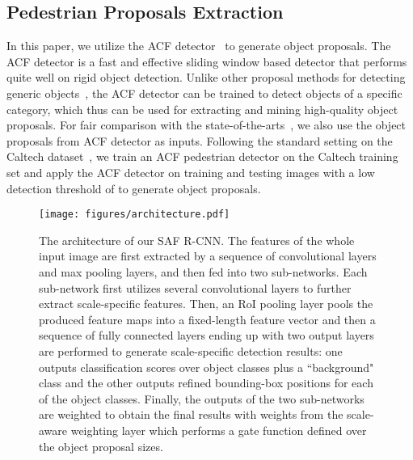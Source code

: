 \documentclass[journal]{IEEEtran}
\begin{document}
\subsection{Pedestrian Proposals Extraction}
In this paper, we utilize the ACF detector~\cite{dollar2014fast} to generate object proposals. The ACF detector is a fast and effective sliding window based detector that performs quite well on rigid object detection. Unlike other proposal methods for detecting generic objects~\cite{uijlings2013selective,arbelaez2014multiscale,zitnick2014edge}, the ACF detector can be trained to detect objects of a specific category, which thus can be used for extracting and mining high-quality object proposals. For fair comparison with the state-of-the-arts~\cite{hosang2015taking,ta_cnn}, we also use the object proposals from ACF detector as inputs. Following the standard setting on the Caltech dataset~\cite{dollar2012pedestrian}, we train an ACF pedestrian detector on the Caltech training set and apply the ACF detector on training and testing images with a low detection threshold of  to generate object proposals.

\begin{figure*}
	\begin{center}
		\texttt{[image: figures/architecture.pdf]}
		\caption{{The architecture of our SAF R-CNN. The features of the whole input image are first extracted by a sequence of convolutional layers and max pooling layers, and then fed into two sub-networks. Each sub-network first utilizes several convolutional layers to further extract scale-specific features. Then, an RoI pooling layer pools the produced feature maps into a fixed-length feature vector and then a sequence of fully connected layers ending up with two output layers are performed to generate scale-specific detection results: one outputs classification scores over  object classes plus a ``background" class and the other outputs refined bounding-box positions for each of the  object classes. Finally, the outputs of the two sub-networks are weighted to obtain the final results with weights from the scale-aware weighting layer which performs a gate function defined over the object proposal sizes.}}	
		\label{fig:architecture}
	\end{center}
	\vspace{-4mm}
\end{figure*}
\end{document}
